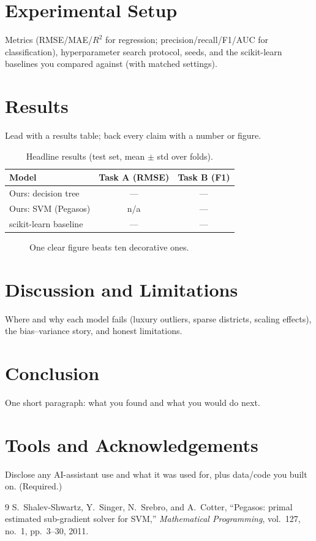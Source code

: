 \documentclass[10pt,twocolumn,a4paper]{article}
\begin{document}
\section{Experimental Setup}
Metrics (RMSE/MAE/$R^2$ for regression; precision/recall/F1/AUC for
classification), hyperparameter search protocol, seeds, and the
scikit-learn baselines you compared against (with matched settings).

\section{Results}
Lead with a results table; back every claim with a number or figure.

\begin{table}[t]
  \centering
  \caption{Headline results (test set, mean $\pm$ std over folds).}
  \label{tab:results}
  \begin{tabular}{@{}lcc@{}}
    \toprule
    Model & Task A (RMSE) & Task B (F1) \\
    \midrule
    Ours: decision tree     & --- & --- \\
    Ours: SVM (Pegasos)     & n/a & --- \\
    scikit-learn baseline   & --- & --- \\
    \bottomrule
  \end{tabular}
\end{table}

\begin{figure}[t]
  \centering
  \caption{One clear figure beats ten decorative ones.}
  \label{fig:main}
\end{figure}

\section{Discussion and Limitations}
Where and why each model fails (luxury outliers, sparse districts,
scaling effects), the bias--variance story, and honest limitations.

\section{Conclusion}
One short paragraph: what you found and what you would do next.

\section*{Tools and Acknowledgements}
Disclose any AI-assistant use and what it was used for, plus data/code
you built on. (Required.)

\begin{thebibliography}{9}
S.~Shalev-Shwartz, Y.~Singer, N.~Srebro, and A.~Cotter,
``Pegasos: primal estimated sub-gradient solver for SVM,''
\emph{Mathematical Programming}, vol.~127, no.~1, pp.~3--30, 2011.
\end{thebibliography}
\end{document}
